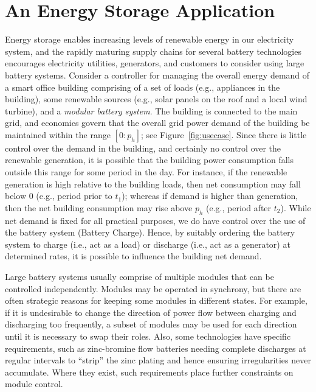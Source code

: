 \section{An Energy Storage Application}\label{sec:application}



Energy storage enables increasing levels of renewable energy in our electricity system, and the rapidly maturing supply chains for several battery technologies encourages electricity utilities, generators, and customers to consider using large battery systems. 
Consider a controller for managing the overall energy demand of a smart office building comprising of a set of loads (e.g., appliances in the building), some renewable sources (e.g., solar panels on the roof and a local wind turbine), and a \emph{modular battery system}. The building is connected to the main grid, and economics govern that the overall grid power demand of the building be maintained within the range $[0:p_h]$; see Figure~\ref{fig:usecase}. 
Since there is little control over the demand in the building, and certainly no control over the renewable generation, it is possible that the building power consumption falls outside this range for some period in the day. For instance, if the renewable generation is high relative to the building loads, then net consumption may fall below $0$ (e.g., period prior to $t_1$); whereas if demand is higher than generation, then the net building consumption may rise above $p_h$ (e.g., period after $t_2$). 
%
While net demand is fixed for all practical purposes, we do have control over the use of the battery system (Battery Charge). Hence, by suitably ordering the battery system to charge (i.e., act as a load) or discharge (i.e., act as a generator) at determined rates, it is possible to influence the building net demand. 

Large battery systems usually comprise of multiple modules that can be controlled independently.  Modules may be operated in synchrony, but there are often strategic reasons for keeping some modules in different states.  For example, if it is undesirable to change the direction of power flow between charging and discharging too frequently, a subset of modules may be used for each direction until it is necessary to swap their roles. Also, some technologies have specific requirements, such as zinc-bromine flow batteries needing complete discharges at regular intervals to ``strip'' the zinc plating and hence ensuring irregularities never accumulate. Where they exist, such requirements place further constraints on module control.

